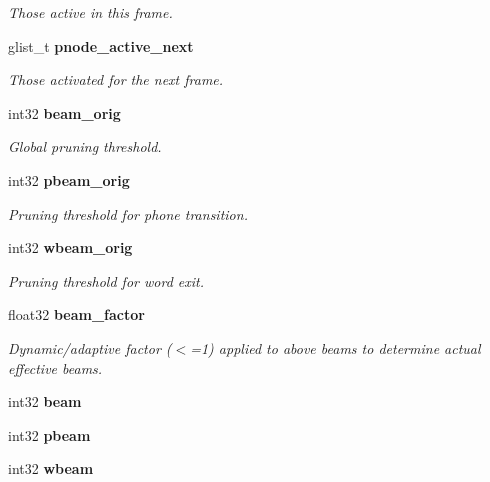 \begin{DoxyCompactItemize}
\begin{DoxyCompactList}\small\item\em Those active in this frame. \end{DoxyCompactList}\item 
glist\+\_\+t {\bf pnode\+\_\+active\+\_\+next}\label{structfsg__search__s_aa2dfc00e1f34041dacd9572b0d659775}

\begin{DoxyCompactList}\small\item\em Those activated for the next frame. \end{DoxyCompactList}\item 
int32 {\bf beam\+\_\+orig}\label{structfsg__search__s_a0cdf7dc3d3eed0d37f46cb71fdea206e}

\begin{DoxyCompactList}\small\item\em Global pruning threshold. \end{DoxyCompactList}\item 
int32 {\bf pbeam\+\_\+orig}\label{structfsg__search__s_a7cdf0ab2591b95d89940d51e3ab01529}

\begin{DoxyCompactList}\small\item\em Pruning threshold for phone transition. \end{DoxyCompactList}\item 
int32 {\bf wbeam\+\_\+orig}\label{structfsg__search__s_a7f3ecc2f769143e42ed958744478db3c}

\begin{DoxyCompactList}\small\item\em Pruning threshold for word exit. \end{DoxyCompactList}\item 
float32 {\bf beam\+\_\+factor}
\begin{DoxyCompactList}\small\item\em Dynamic/adaptive factor ($<$=1) applied to above beams to determine actual effective beams. \end{DoxyCompactList}\item 
int32 {\bfseries beam}\label{structfsg__search__s_a1dbc28682f610fef5b79fd8a182f4395}

\item 
int32 {\bfseries pbeam}\label{structfsg__search__s_a373ffd62c4bcb07a6f28378ea33161e1}

\item 
int32 {\bf wbeam}\label{structfsg__search__s_af28ddecbb5115a50712c61f8a72dcf51}


\end{DoxyCompactItemize}
